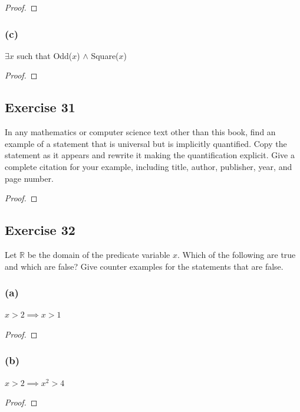 \documentclass[14pt]{extarticle}
\newcommand{\R}{\mathbb{R}}
\newcommand{\te}{\exists}
\begin{document}
\begin{proof}

\end{proof}

\subsubsection{(c)}
$\te x$ such that Odd($x$) $\wedge$ Square($x$)

\begin{proof}

\end{proof}

\subsection{Exercise 31}
In any mathematics or computer science text other than this book, find an example of a statement that is universal but is implicitly quantified. Copy the statement as it appears and rewrite it making the quantification explicit. Give a complete citation for your example, including title, author, publisher,
year, and page number.

\begin{proof}

\end{proof}

\subsection{Exercise 32}
Let $\R$ be the domain of the predicate variable $x$. Which of the following are true and which are false? Give counter examples for the statements that are false.

\subsubsection{(a)}
$x > 2 \implies x > 1$

\begin{proof}

\end{proof}

\subsubsection{(b)}
$x > 2 \implies x^2 > 4$

\begin{proof}

\end{proof}
\end{document}
